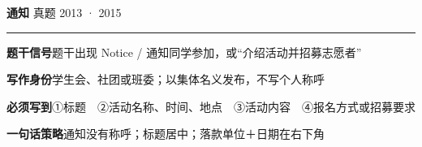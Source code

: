 \documentclass[11pt,a4paper]{ctexart}
\begin{document}
\clearpage
{}\label{g10}
\noindent{\color{accent}\rule{\linewidth}{1.5pt}}\par\vspace{3pt}
\hspace{6pt}
{\LARGE\bfseries 通知}\hfill
{\footnotesize\color{gray} 真题 2013 · 2015}\par
\vspace{1pt}
{\color{accent!35}\rule{\linewidth}{0.5pt}}\par\vspace{3pt}
{\footnotesize {\color{accent}\bfseries 题干信号}\quad 题干出现 Notice / 通知同学参加，或“介绍活动并招募志愿者”}\par
{\footnotesize {\color{accent}\bfseries 写作身份}\quad 学生会、社团或班委；以集体名义发布，不写个人称呼}\par
{\footnotesize {\color{accent}\bfseries 必须写到}\quad ①标题　②活动名称、时间、地点　③活动内容　④报名方式或招募要求}\par
{\footnotesize {\color{accent}\bfseries 一句话策略}\quad 通知没有称呼；标题居中；落款单位＋日期在右下角}\par
\end{document}

